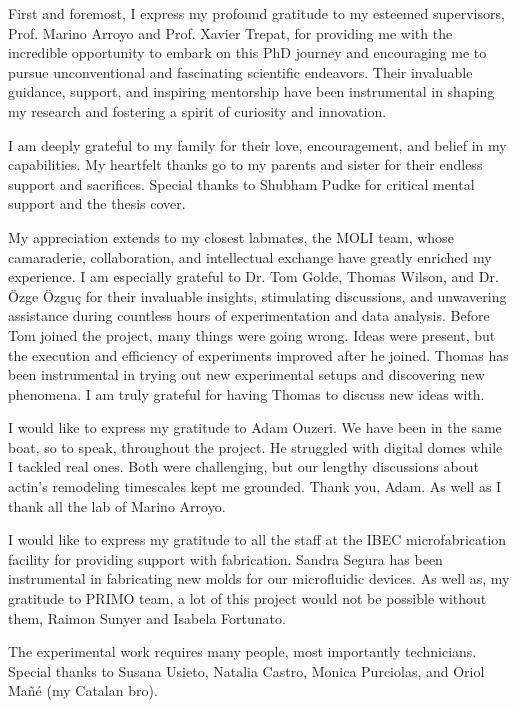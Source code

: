 \begin{Acknowledgements}
First and foremost, I express my profound gratitude to my esteemed supervisors, Prof. Marino Arroyo and Prof. Xavier Trepat, for providing me with the incredible opportunity to embark on this PhD journey and encouraging me to pursue unconventional and fascinating scientific endeavors. Their invaluable guidance, support, and inspiring mentorship have been instrumental in shaping my research and fostering a spirit of curiosity and innovation.

I am deeply grateful to my family for their love, encouragement, and belief in my capabilities. My heartfelt thanks go to my parents and sister for their endless support and sacrifices. Special thanks to Shubham Pudke for critical mental support and the thesis cover.
	
My appreciation extends to my closest labmates, the MOLI team, whose camaraderie, collaboration, and intellectual exchange have greatly enriched my experience. I am especially grateful to Dr. Tom Golde, Thomas Wilson, and Dr. Özge Özguç for their invaluable insights, stimulating discussions, and unwavering assistance during countless hours of experimentation and data analysis. Before Tom joined the project, many things were going wrong. Ideas were present, but the execution and efficiency of experiments improved after he joined. Thomas has been instrumental in trying out new experimental setups and discovering new phenomena. I am truly grateful for having Thomas to discuss new ideas with.

I would like to express my gratitude to Adam Ouzeri. We have been in the same boat, so to speak, throughout the project. He struggled with digital domes while I tackled real ones. Both were challenging, but our lengthy discussions about actin's remodeling timescales kept me grounded. Thank you, Adam. As well as I thank all the lab of Marino Arroyo.

I would like to express my gratitude to all the staff at the IBEC microfabrication facility for providing support with fabrication. Sandra Segura has been instrumental in fabricating new molds for our microfluidic devices. As well as, my gratitude to PRIMO team, a lot of this project would not be possible without them, Raimon Sunyer and Isabela Fortunato.

The experimental work requires many people, most importantly technicians. Special thanks to Susana Usieto, Natalia Castro, Monica Purciolas, and Oriol Mañé (my Catalan bro).


\end{Acknowledgements}
